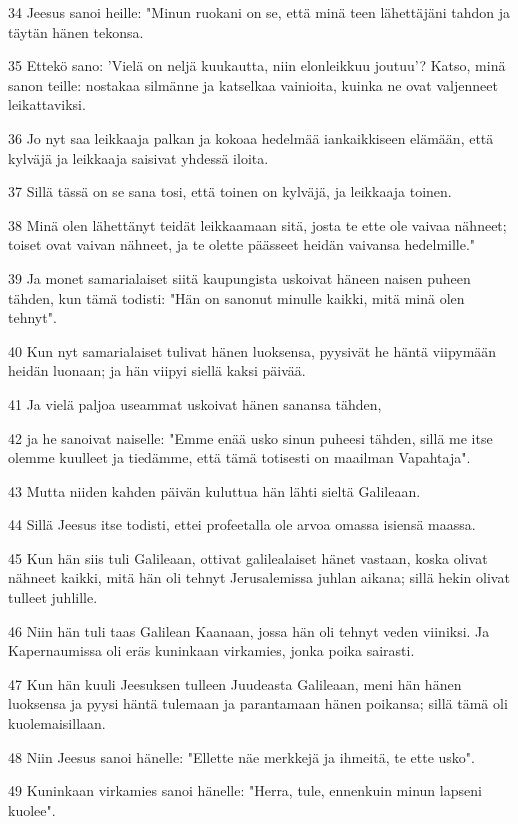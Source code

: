 \par 34 Jeesus sanoi heille: "Minun ruokani on se, että minä teen lähettäjäni tahdon ja täytän hänen tekonsa.
\par 35 Ettekö sano: 'Vielä on neljä kuukautta, niin elonleikkuu joutuu'? Katso, minä sanon teille: nostakaa silmänne ja katselkaa vainioita, kuinka ne ovat valjenneet leikattaviksi.
\par 36 Jo nyt saa leikkaaja palkan ja kokoaa hedelmää iankaikkiseen elämään, että kylväjä ja leikkaaja saisivat yhdessä iloita.
\par 37 Sillä tässä on se sana tosi, että toinen on kylväjä, ja leikkaaja toinen.
\par 38 Minä olen lähettänyt teidät leikkaamaan sitä, josta te ette ole vaivaa nähneet; toiset ovat vaivan nähneet, ja te olette päässeet heidän vaivansa hedelmille."
\par 39 Ja monet samarialaiset siitä kaupungista uskoivat häneen naisen puheen tähden, kun tämä todisti: "Hän on sanonut minulle kaikki, mitä minä olen tehnyt".
\par 40 Kun nyt samarialaiset tulivat hänen luoksensa, pyysivät he häntä viipymään heidän luonaan; ja hän viipyi siellä kaksi päivää.
\par 41 Ja vielä paljoa useammat uskoivat hänen sanansa tähden,
\par 42 ja he sanoivat naiselle: "Emme enää usko sinun puheesi tähden, sillä me itse olemme kuulleet ja tiedämme, että tämä totisesti on maailman Vapahtaja".
\par 43 Mutta niiden kahden päivän kuluttua hän lähti sieltä Galileaan.
\par 44 Sillä Jeesus itse todisti, ettei profeetalla ole arvoa omassa isiensä maassa.
\par 45 Kun hän siis tuli Galileaan, ottivat galilealaiset hänet vastaan, koska olivat nähneet kaikki, mitä hän oli tehnyt Jerusalemissa juhlan aikana; sillä hekin olivat tulleet juhlille.
\par 46 Niin hän tuli taas Galilean Kaanaan, jossa hän oli tehnyt veden viiniksi. Ja Kapernaumissa oli eräs kuninkaan virkamies, jonka poika sairasti.
\par 47 Kun hän kuuli Jeesuksen tulleen Juudeasta Galileaan, meni hän hänen luoksensa ja pyysi häntä tulemaan ja parantamaan hänen poikansa; sillä tämä oli kuolemaisillaan.
\par 48 Niin Jeesus sanoi hänelle: "Ellette näe merkkejä ja ihmeitä, te ette usko".
\par 49 Kuninkaan virkamies sanoi hänelle: "Herra, tule, ennenkuin minun lapseni kuolee".
